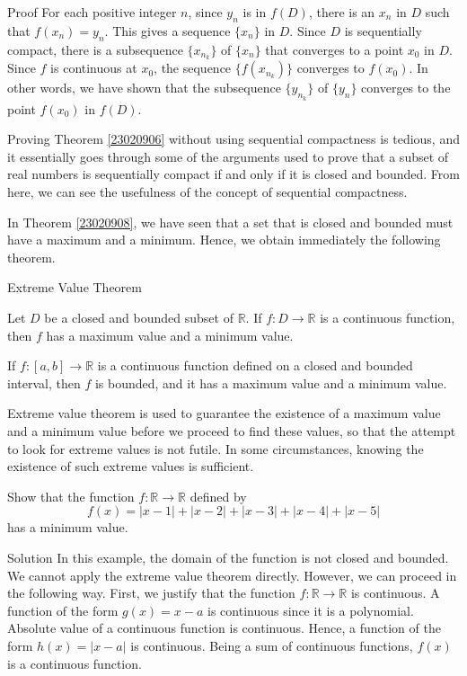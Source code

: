 \begin{example}
\begin{myproof}{Proof}
  For each positive integer $n$, since $y_n$ is in $f(D)$, there is an $x_n$ in $D$ such that $f(x_n)=y_n$. This gives a sequence $\{x_n\}$ in $D$. Since $D$ is sequentially compact, there is a subsequence $\{x_{n_k}\}$ of $\{x_n\}$ that converges to a point $x_0$ in $D$. Since $f$ is continuous at $x_0$, the sequence $\{f(x_{n_k})\}$ converges to $f(x_0)$. In other words, we have shown that the subsequence $\{y_{n_k}\}$ of $\{y_n\}$ converges to the point $f(x_0)$ in $f(D)$.
 

  \end{myproof}
  
Proving Theorem \ref{23020906}   without using  sequential compactness is tedious, and it essentially goes through some of the arguments used to prove that a subset of real numbers is sequentially compact if and only if it is closed and bounded. From here, we can see the usefulness of the concept of sequential compactness.
  
  In Theorem \ref{23020908}, we have seen that a set that is closed and bounded must have a maximum and a minimum. Hence, we obtain immediately the following   theorem.
  
  \begin{theorem}[label=23020909]{Extreme Value Theorem}
 
  Let $D$ be a closed and bounded subset of $\mathbb{R}$. If $f:D\rightarrow \mathbb{R}$ is  a continuous function, then $f$ has a maximum value and a minimum value. 
    \end{theorem}
    \begin{corollary}{}
  If $f:[a,b]\rightarrow\mathbb{R}$ is a continuous function defined on a closed and bounded interval, then $f$ is bounded, and it has a maximum value and a minimum value. \end{corollary}

  
  Extreme value theorem is used to guarantee the existence of a maximum value and a minimum value before we proceed to find these values, so that the attempt to look for extreme values is not futile. In some circumstances, knowing the existence of such extreme values is sufficient. 
  
  \begin{example}{}
  Show that the function $f:\mathbb{R}\rightarrow\mathbb{R}$ defined by 
  \[f(x)=|x-1|+|x-2|+|x-3|+|x-4|+|x-5|\] has a minimum value. 
  \end{example}
  \begin{solution}{Solution}
  In this example, the domain of the function is not closed and bounded. We cannot apply the extreme value theorem directly. However, we can proceed in the following way.
  First, we justify that the function  $f:\mathbb{R}\rightarrow\mathbb{R}$  is continuous. A function of the form $g(x)=x-a$ is continuous since it is a polynomial. Absolute value of a continuous function is continuous. Hence, a function of the form $h(x)=|x-a|$ is continuous. Being a sum of continuous functions, $f(x)$ is a continuous function.


\end{solution}
\end{example}
